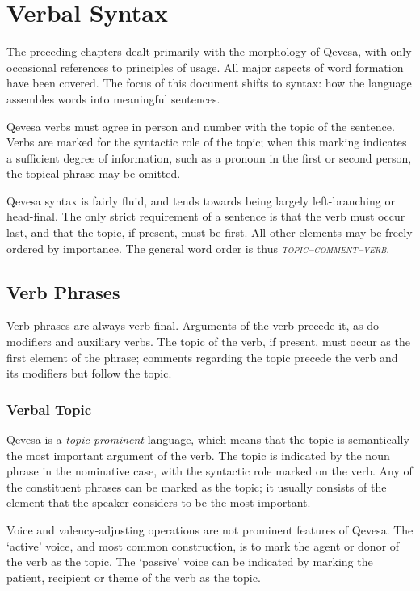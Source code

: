 \documentclass[grammar]{subfiles}
\begin{document}
  \chapter{Verbal Syntax}
  \label{ch:verbal-syntax}

  The preceding chapters dealt primarily with the morphology of Qevesa, with only occasional references to principles of usage. All major aspects of word formation have been covered. The focus of this document shifts to syntax: how the language assembles words into meaningful sentences.

  Qevesa verbs must agree in person and number with the topic of the sentence. Verbs are marked for the syntactic role of the topic; when this marking indicates a sufficient degree of information, such as a pronoun in the first or second person, the topical phrase may be omitted.

  Qevesa syntax is fairly fluid, and tends towards being largely left-branching or head-final. The only strict requirement of a sentence is that the verb must occur last, and that the topic, if present, must be first. All other elements may be freely ordered by importance. The general word order is thus \emph{\textsc{topic–comment–verb}}.

  \section{Verb Phrases}
  \label{sec:syn_verb_phrases}

  Verb phrases are always verb-final. Arguments of the verb precede it, as do modifiers and auxiliary verbs. The topic of the verb, if present, must occur as the first element of the phrase; comments regarding the topic precede the verb and its modifiers but follow the topic.

  \subsection{Verbal Topic}
  \label{ssec:syn_verbal_topic}

  Qevesa is a \emph{topic-prominent} language, which means that the topic is semantically the most important argument of the verb. The topic is indicated by the noun phrase in the nominative case, with the syntactic role marked on the verb. Any of the constituent phrases can be marked as the topic; it usually consists of the element that the speaker considers to be the most important.

  Voice and valency-adjusting operations are not prominent features of Qevesa. The ‘active’ voice, and most common construction, is to mark the agent or donor of the verb as the topic. The ‘passive’ voice can be indicated by marking the patient, recipient or theme of the verb as the topic.
\end{document}
